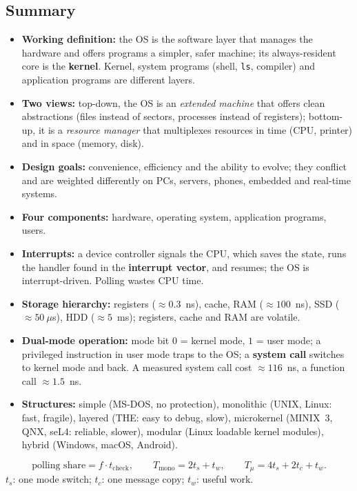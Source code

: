 \documentclass[11pt,a4paper]{article}
\newcommand{\term}[1]{\textbf{\color{mintdeep}#1}}
\newcommand{\cmd}[1]{\texttt{#1}}
\begin{document}
\subsection*{Summary}
\begin{itemize}
  \item \textbf{Working definition:} the OS is the software layer that manages the hardware and offers programs a simpler, safer machine; its always-resident core is the \term{kernel}. Kernel, system programs (shell, \cmd{ls}, compiler) and application programs are different layers.
  \item \textbf{Two views:} top-down, the OS is an \emph{extended machine} that offers clean abstractions (files instead of sectors, processes instead of registers); bottom-up, it is a \emph{resource manager} that multiplexes resources in time (CPU, printer) and in space (memory, disk).
  \item \textbf{Design goals:} convenience, efficiency and the ability to evolve; they conflict and are weighted differently on PCs, servers, phones, embedded and real-time systems.
  \item \textbf{Four components:} hardware, operating system, application programs, users.
  \item \textbf{Interrupts:} a device controller signals the CPU, which saves the state, runs the handler found in the \term{interrupt vector}, and resumes; the OS is interrupt-driven. Polling wastes CPU time.
  \item \textbf{Storage hierarchy:} registers ($\approx 0.3$~ns), cache, RAM ($\approx 100$~ns), SSD ($\approx 50\ \mu$s), HDD ($\approx 5$~ms); registers, cache and RAM are volatile.
  \item \textbf{Dual-mode operation:} mode bit $0$ = kernel mode, $1$ = user mode; a privileged instruction in user mode traps to the OS; a \term{system call} switches to kernel mode and back. A measured system call cost $\approx 116$~ns, a function call $\approx 1.5$~ns.
  \item \textbf{Structures:} simple (MS-DOS, no protection), monolithic (UNIX, Linux: fast, fragile), layered (THE: easy to debug, slow), microkernel (MINIX~3, QNX, seL4: reliable, slower), modular (Linux loadable kernel modules), hybrid (Windows, macOS, Android).
\end{itemize}

\begin{keyidea}
\[
\text{polling share} = f \cdot t_{\text{check}}, \qquad
T_{\text{mono}} = 2t_{s} + t_{w}, \qquad
T_{\mu} = 4t_{s} + 2t_{c} + t_{w}.
\]
$t_s$: one mode switch; $t_c$: one message copy; $t_w$: useful work.
\end{keyidea}
\end{document}
